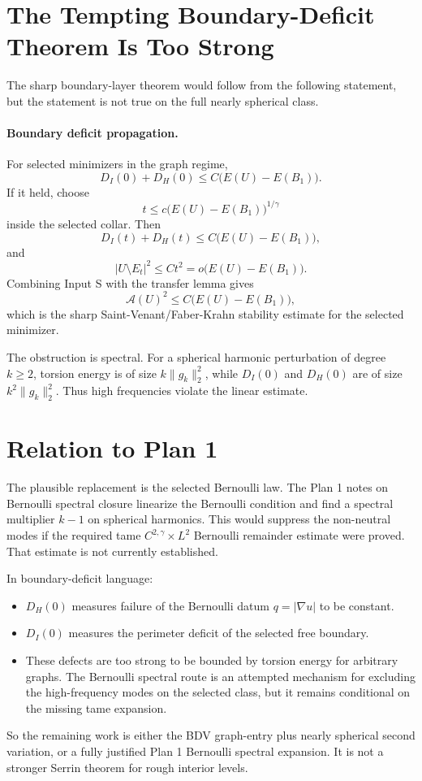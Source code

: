 \documentclass[11pt]{article}
\begin{document}
\section{The Tempting Boundary-Deficit Theorem Is Too Strong}

The sharp boundary-layer theorem would follow from the following statement, but
the statement is not true on the full nearly spherical class.

\paragraph{Boundary deficit propagation.}
For selected minimizers in the graph regime,
\[
D_I(0)+D_H(0)
\le
C\bigl(E(U)-E(B_1)\bigr).
\]
If it held, choose
\[
t\le c\bigl(E(U)-E(B_1)\bigr)^{1/\gamma}
\]
inside the selected collar. Then
\[
D_I(t)+D_H(t)\le C\bigl(E(U)-E(B_1)\bigr),
\]
and
\[
|U\setminus E_t|^2\le C t^2
=o\bigl(E(U)-E(B_1)\bigr).
\]
Combining Input S with the transfer lemma gives
\[
\mathcal A(U)^2
\le C\bigl(E(U)-E(B_1)\bigr),
\]
which is the sharp Saint-Venant/Faber-Krahn stability estimate for the selected
minimizer.

The obstruction is spectral. For a spherical harmonic perturbation of degree
\(k\ge2\), torsion energy is of size \(k\|g_k\|_2^2\), while \(D_I(0)\) and
\(D_H(0)\) are of size \(k^2\|g_k\|_2^2\). Thus high frequencies violate the
linear estimate.

\section{Relation to Plan 1}

The plausible replacement is the selected Bernoulli law. The Plan 1 notes on
Bernoulli spectral closure linearize the Bernoulli condition and find a
spectral multiplier \(k-1\) on spherical harmonics. This would suppress the
non-neutral modes if the required tame \(C^{2,\gamma}\times L^2\) Bernoulli
remainder estimate were proved. That estimate is not currently established.

In boundary-deficit language:
\begin{itemize}
\item \(D_H(0)\) measures failure of the Bernoulli datum \(q=|\nabla u|\) to be
constant.
\item \(D_I(0)\) measures the perimeter deficit of the selected free boundary.
\item These defects are too strong to be bounded by torsion energy for
arbitrary graphs. The Bernoulli spectral route is an attempted mechanism for
excluding the high-frequency modes on the selected class, but it remains
conditional on the missing tame expansion.
\end{itemize}
So the remaining work is either the BDV graph-entry plus nearly spherical second
variation, or a fully justified Plan 1 Bernoulli spectral expansion. It is not a
stronger Serrin theorem for rough interior levels.
\end{document}
